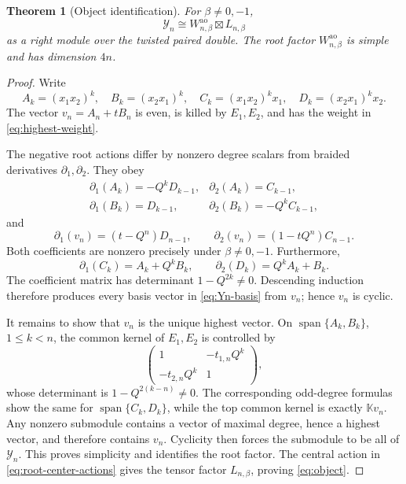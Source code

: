 \documentclass[11pt,a4paper]{article}
\newcommand{\hK}{\mathbb K}
\newcommand{\ao}{\mathrm{ao}}
\newtheorem{theorem}{Theorem}[section]
\theoremstyle{definition}
\theoremstyle{remark}
\begin{document}
\begin{theorem}[Object identification]\label{thm:object}
For \(\beta\neq0,-1\),
\begin{equation}\label{eq:object}
 \mathcal Y_n
 \cong W_{n,\beta}^{\ao}\boxtimes L_{n,\beta}
\end{equation}
as a right module over the twisted paired double.  The root factor
\(W_{n,\beta}^{\ao}\) is simple and has dimension \(4n\).
\end{theorem}

\begin{proof}
Write
\[
 A_k=(x_1x_2)^k,\quad B_k=(x_2x_1)^k,\quad
 C_k=(x_1x_2)^kx_1,\quad D_k=(x_2x_1)^kx_2.
\]
The vector \(v_n=A_n+tB_n\) is even, is killed by \(E_1,E_2\), and has
the weight in \eqref{eq:highest-weight}.

The negative root actions differ by nonzero degree scalars from braided
derivatives \(\partial_1,\partial_2\).  They obey
\[
\begin{array}{ll}
\partial_1(A_k)=-Q^kD_{k-1},&
\partial_2(A_k)=C_{k-1},\\
\partial_1(B_k)=D_{k-1},&
\partial_2(B_k)=-Q^kC_{k-1},
\end{array}
\]
and
\[
 \partial_1(v_n)=(t-Q^n)D_{n-1},\qquad
 \partial_2(v_n)=(1-tQ^n)C_{n-1}.
\]
Both coefficients are nonzero precisely under
\(\beta\neq0,-1\).  Furthermore,
\[
 \partial_1(C_k)=A_k+Q^kB_k,\qquad
 \partial_2(D_k)=Q^kA_k+B_k.
\]
The coefficient matrix has determinant \(1-Q^{2k}\neq0\).
Descending induction therefore produces every basis vector in
\eqref{eq:Yn-basis} from \(v_n\); hence \(v_n\) is cyclic.

It remains to show that \(v_n\) is the unique highest vector.  On
\(\operatorname{span}\{A_k,B_k\}\), \(1\leq k<n\), the common kernel of
\(E_1,E_2\) is controlled by
\[
 \begin{pmatrix}
 1&-t_{1,n}Q^k\\
 -t_{2,n}Q^k&1
 \end{pmatrix},
\]
whose determinant is \(1-Q^{2(k-n)}\neq0\).  The corresponding odd-degree
formulas show the same for \(\operatorname{span}\{C_k,D_k\}\), while the
top common kernel is exactly \(\hK v_n\).  Any nonzero submodule contains
a vector of maximal degree, hence a highest vector, and therefore
contains \(v_n\).  Cyclicity then forces the submodule to be all of
\(\mathcal Y_n\).  This proves simplicity and identifies the root factor.
The central action in \eqref{eq:root-center-actions} gives the tensor
factor \(L_{n,\beta}\), proving \eqref{eq:object}.
\end{proof}
\end{document}
